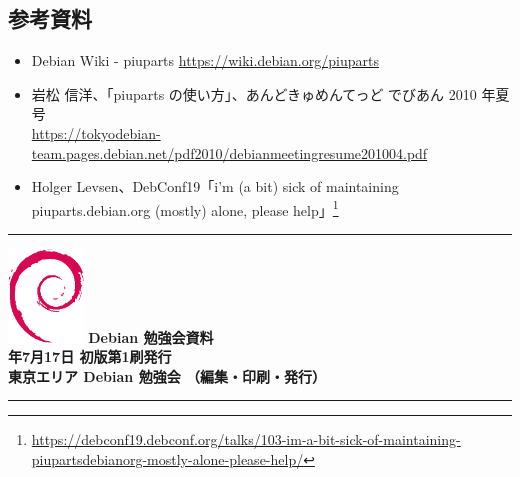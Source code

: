 \documentclass[mingoth,a4paper]{jsarticle}
\newcommand{\debmtgyear}{2021}
\newcommand{\debmtgmonth}{7}
\newcommand{\debmtgdate}{17}
\begin{document}
\subsection{参考資料}

\begin{itemize}
\item Debian Wiki - piuparts \url{https://wiki.debian.org/piuparts}
\item 岩松 信洋、「piuparts の使い方」、あんどきゅめんてっど でびあん 2010 年夏号 \\
\url{https://tokyodebian-team.pages.debian.net/pdf2010/debianmeetingresume201004.pdf}
\item Holger Levsen、DebConf19「i'm (a bit) sick of maintaining piuparts.debian.org (mostly) alone, please help」\footnote{\url{https://debconf19.debconf.org/talks/103-im-a-bit-sick-of-maintaining-piupartsdebianorg-mostly-alone-please-help/}}
\end{itemize}



\vspace*{15cm}
\hrule
\vspace{2mm}
\includegraphics[width=2cm]{image-assets/openlogo-nd.eps}
\noindent \Large \bf Debian 勉強会資料\\
\noindent \normalfont \debmtgyear{}年\debmtgmonth{}月\debmtgdate{}日 \hspace{5mm}  初版第1刷発行\\
\noindent \normalfont 東京エリア Debian 勉強会 （編集・印刷・発行）\\
\hrule
\end{document}
